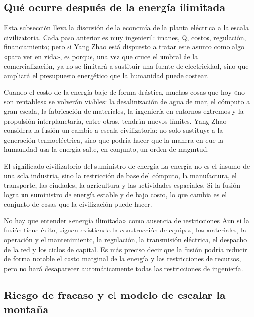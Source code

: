 \subsection{Qué ocurre después de la energía ilimitada}

Esta subsección lleva la discusión de la economía de la planta eléctrica a la escala civilizatoria. Cada paso anterior es muy ingenieril: imanes, Q, costos, regulación, financiamiento; pero si Yang Zhao está dispuesto a tratar este asunto como algo «para ver en vida», es porque, una vez que cruce el umbral de la comercialización, ya no se limitará a sustituir una fuente de electricidad, sino que ampliará el presupuesto energético que la humanidad puede costear.

Cuando el costo de la energía baje de forma drástica, muchas cosas que hoy «no son rentables» se volverán viables: la desalinización de agua de mar, el cómputo a gran escala, la fabricación de materiales, la ingeniería en entornos extremos y la propulsión interplanetaria, entre otras, tendrán nuevos límites. Yang Zhao considera la fusión un cambio a escala civilizatoria: no solo sustituye a la generación termoeléctrica, sino que podría hacer que la manera en que la humanidad usa la energía salte, en conjunto, un orden de magnitud.

\begin{importantbox}{El significado civilizatorio del suministro de energía}
La energía no es el insumo de una sola industria, sino la restricción de base del cómputo, la manufactura, el transporte, las ciudades, la agricultura y las actividades espaciales. Si la fusión logra un suministro de energía estable y de bajo costo, lo que cambia es el conjunto de cosas que la civilización puede hacer.
\end{importantbox}

\begin{warningbox}{No hay que entender «energía ilimitada» como ausencia de restricciones}
Aun si la fusión tiene éxito, siguen existiendo la construcción de equipos, los materiales, la operación y el mantenimiento, la regulación, la transmisión eléctrica, el despacho de la red y los ciclos de capital. Es más preciso decir que la fusión podría reducir de forma notable el costo marginal de la energía y las restricciones de recursos, pero no hará desaparecer automáticamente todas las restricciones de ingeniería.
\end{warningbox}

\subsection{Riesgo de fracaso y el modelo de escalar la montaña}

